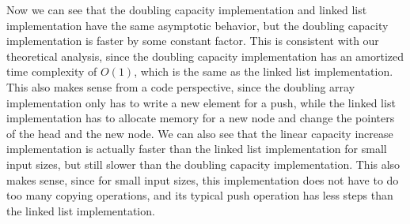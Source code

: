 \documentclass{article}
\begin{document}
Now we can see that the doubling capacity implementation and linked list implementation have the same asymptotic behavior, but the doubling capacity implementation is faster by some constant factor. 
This is consistent with our theoretical analysis, since the doubling capacity implementation has an amortized time complexity of $O(1)$, which is the same as the linked list implementation. 
This also makes sense from a code perspective, since the doubling array implementation only has to write a new element for a push, while the linked list implementation has to allocate memory for a new node and change the pointers of the head and the new node. 
We can also see that the linear capacity increase implementation is actually faster than the linked list implementation for small input sizes, but still slower than the doubling capacity implementation. 
This also makes sense, since for small input sizes, this implementation does not have to do too many copying operations, and its typical push operation has less steps than the linked list implementation.
\end{document}
